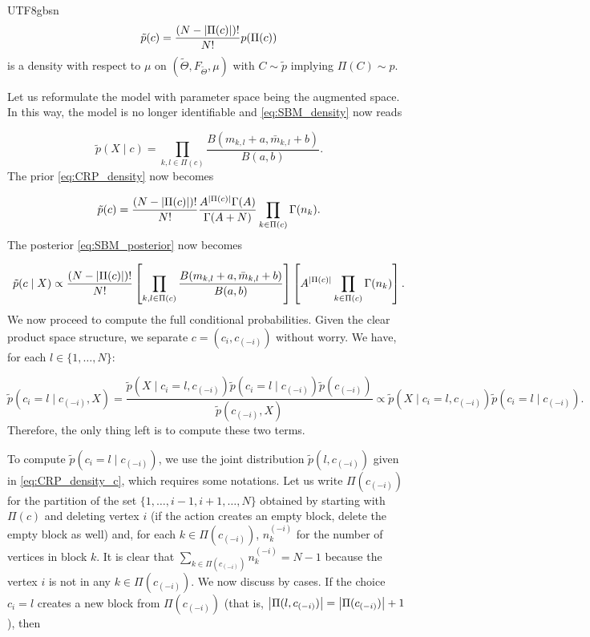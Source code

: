 \documentclass[12pt]{report}
\newcommand{\squared}[1]{\left [ #1 \right ]}
\theoremstyle{plain}
\theoremstyle{definition}
\begin{document}
\begin{CJK*}{UTF8}{gbsn}
\begin{equation*}
  \tilde{p}(c) = \frac{(N-\abs{\Pi(c)})!}{N!}p(\Pi(c))
\end{equation*}
is a density with respect to $\mu$ on $(\tilde{\Theta}, F_{\tilde{\Theta}}, \mu)$
with $C \sim \tilde{p}$ implying $\Pi(C)\sim p$.

Let us reformulate the model with parameter space being the augmented space.
In this way, the model is no longer identifiable and \eqref{eq:SBM_density}
now reads

\begin{equation}\label{eq:SBM_density_c}
  \tilde{p}(X \mid c)  =
  \prod_{k, l \in \Pi(c)}
  \frac{B(m_{k,l}+a, \bar{m}_{k,l}+b)}{B(a,b)}.
\end{equation}
The prior \eqref{eq:CRP_density} now becomes

\begin{equation}\label{eq:CRP_density_c}
 \tilde{p}(c) = \frac{(N-\abs{\Pi(c)})!}{N!}
 \frac{A^{\abs{\Pi(c)}} \Gamma(A)}{\Gamma(A + N)} \prod_{k \in \Pi(c)} \Gamma(n_k).
\end{equation}
The posterior \eqref{eq:SBM_posterior} now becomes

\begin{equation}\label{eq:SBM_posterior_c}
  \tilde{p}(c \mid X) 
  \propto \frac{(N-\abs{\Pi(c)})!}{N!} \squared{
  \prod_{k,l \in \Pi(c)} \frac{B(m_{k,l}+a, \bar{m}_{k,l}+b)}{B(a,b)}}
  \squared{A^{\abs{\Pi(c)}} \prod_{k \in \Pi(c)} \Gamma(n_k)}.
\end{equation}
We now proceed to compute the full conditional probabilities.
Given the clear product space structure, we separate 
$c = (c_i, c_{(-i)})$ without worry. We have, for each $l \in \{1, \ldots, N\}$:

\begin{equation}\label{eq:c_i_l_conditional}
  \tilde{p}(c_i = l \mid c_{(-i)}, X)  = 
  \frac{\tilde{p}(X \mid c_i = l,c_{(-i)}) \tilde{p}(c_i = l \mid c_{(-i)}) \tilde{p}(c_{(-i)})}{
    \tilde{p}(c_{(-i)}, X)} \propto \tilde{p}(X \mid c_i = l,c_{(-i)}) \tilde{p}(c_i = l \mid c_{(-i)}).
\end{equation}
Therefore, the only thing left is to compute these two terms.

To compute $\tilde{p}(c_i = l \mid c_{(-i)})$, 
we use the joint distribution $\tilde{p}(l,c_{(-i)})$ given in \eqref{eq:CRP_density_c},
which requires some notations. 
Let us write $\Pi(c_{(-i)})$ for the partition 
of the set $\{1, \ldots, i-1, i+1, \ldots, N\}$
obtained by starting with $\Pi(c)$ and deleting vertex $i$ (if the action 
creates an empty block, delete the empty block as well)
and, for each $k \in \Pi(c_{(-i)})$, $n_k^{(-i)}$ for the number 
of vertices in block $k$.
It is clear that $\sum_{k \in \Pi(c_{(-i)})} n_k^{(-i)} = N-1$ because the vertex $i$ 
is not in any $k \in \Pi(c_{(-i)})$.
We now discuss by cases.
If the choice $c_i=l$ creates a new block from $\Pi(c_{(-i)})$
(that is, $\abs{\Pi(l, c_{(-i)})} = \abs{\Pi(c_{(-i)})} + 1$),
then 


\end{CJK*}
\end{document}
